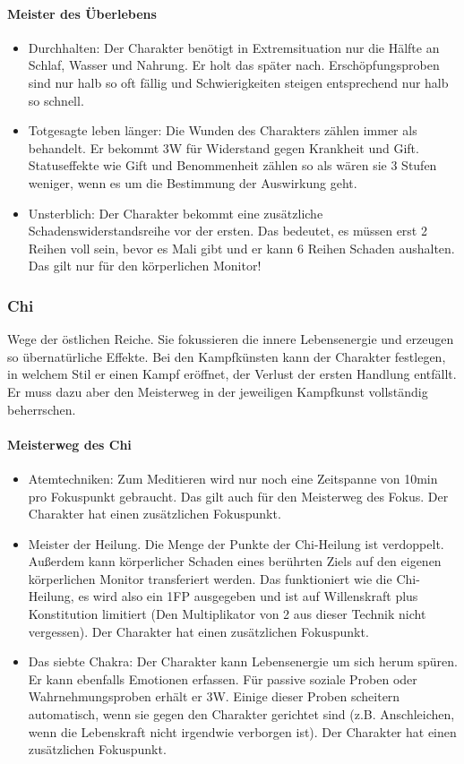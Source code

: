 \documentclass{article}
\begin{document}
\paragraph{Meister des Überlebens}

\begin{itemize}
\item Durchhalten: Der Charakter benötigt in Extremsituation nur die Hälfte an Schlaf, Wasser und Nahrung. Er holt das später nach. Erschöpfungsproben sind nur halb so oft fällig und Schwierigkeiten steigen entsprechend nur halb so schnell.
\item Totgesagte leben länger: Die Wunden des Charakters zählen immer als behandelt. Er bekommt 3W für Widerstand gegen Krankheit und Gift. Statuseffekte wie Gift und Benommenheit zählen so als wären sie 3 Stufen weniger, wenn es um die Bestimmung der Auswirkung geht.
\item Unsterblich: Der Charakter bekommt eine zusätzliche Schadenswiderstandsreihe vor der ersten. Das bedeutet, es müssen erst 2 Reihen voll sein, bevor es Mali gibt und er kann 6 Reihen Schaden aushalten. Das gilt nur für den  körperlichen Monitor!
\end{itemize}

\subsubsection{Chi}

Wege der östlichen Reiche. Sie fokussieren die innere Lebensenergie und erzeugen so übernatürliche Effekte.
Bei den Kampfkünsten kann der Charakter festlegen, in welchem Stil er einen Kampf eröffnet, der Verlust der ersten
Handlung entfällt. Er muss dazu aber den Meisterweg in der jeweiligen Kampfkunst vollständig beherrschen.

\paragraph{Meisterweg des Chi}

\begin{itemize}
\item Atemtechniken: Zum Meditieren wird nur noch eine Zeitspanne von 10min pro Fokuspunkt gebraucht. Das gilt auch für den Meisterweg des Fokus. Der Charakter hat einen zusätzlichen Fokuspunkt.
\item Meister der Heilung. Die Menge der Punkte der Chi-Heilung ist verdoppelt. Außerdem kann körperlicher Schaden eines berührten Ziels auf den eigenen körperlichen Monitor transferiert werden. Das funktioniert wie die Chi-Heilung, es wird also ein 1FP ausgegeben und ist auf Willenskraft plus Konstitution limitiert (Den Multiplikator von 2 aus dieser Technik nicht vergessen). Der Charakter hat einen zusätzlichen Fokuspunkt.
\item Das siebte Chakra: Der Charakter kann Lebensenergie um sich herum spüren. Er kann ebenfalls Emotionen erfassen. Für passive soziale Proben oder Wahrnehmungsproben erhält er 3W. Einige dieser Proben scheitern automatisch, wenn sie gegen den Charakter gerichtet sind (z.B. Anschleichen, wenn die Lebenskraft nicht irgendwie verborgen ist). Der Charakter hat einen zusätzlichen Fokuspunkt.
\end{itemize}
\end{document}
